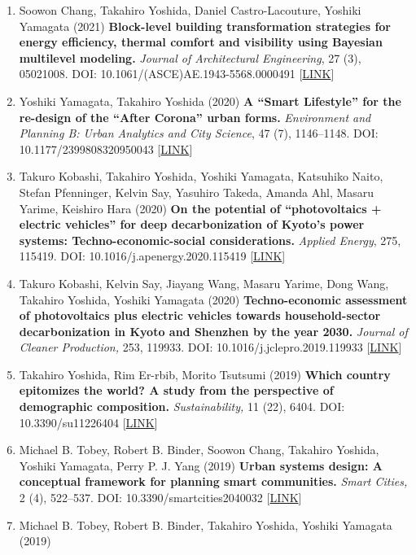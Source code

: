 \documentclass[
]{book}
\begin{document}
\begin{enumerate}
\item
  Soowon Chang, Takahiro Yoshida, Daniel Castro-Lacouture, Yoshiki Yamagata (2021) \textbf{Block-level building transformation strategies for energy efficiency, thermal comfort and visibility using Bayesian multilevel modeling.}
  \emph{Journal of Architectural Engineering}, 27 (3), 05021008.
  DOI: 10.1061/(ASCE)AE.1943-5568.0000491 {[}\href{https://ascelibrary.org/doi/abs/10.1061/\%28ASCE\%29AE.1943-5568.0000491}{LINK}{]}
\item
  Yoshiki Yamagata, Takahiro Yoshida (2020)
  \textbf{A ``Smart Lifestyle'' for the re-design of the ``After Corona'' urban forms.}
  \emph{Environment and Planning B: Urban Analytics and City Science}, 47 (7), 1146--1148.
  DOI: 10.1177/2399808320950043 {[}\href{http://dx.doi.org/10.1177/2399808320950043}{LINK}{]}
\item
  Takuro Kobashi, Takahiro Yoshida, Yoshiki Yamagata, Katsuhiko Naito, Stefan Pfenninger, Kelvin Say, Yasuhiro Takeda, Amanda Ahl, Masaru Yarime, Keishiro Hara (2020)
  \textbf{On the potential of ``photovoltaics + electric vehicles'' for deep decarbonization of Kyoto's power systems: Techno-economic-social considerations.}
  \emph{Applied Energy}, 275, 115419.
  DOI: 10.1016/j.apenergy.2020.115419 {[}\href{https://doi.org/10.1016/j.apenergy.2020.115419}{LINK}{]}
\item
  Takuro Kobashi, Kelvin Say, Jiayang Wang, Masaru Yarime, Dong Wang, Takahiro Yoshida, Yoshiki Yamagata (2020)
  \textbf{Techno-economic assessment of photovoltaics plus electric vehicles towards household-sector decarbonization in Kyoto and Shenzhen by the year 2030.}
  \emph{Journal of Cleaner Production,} 253, 119933.
  DOI: 10.1016/j.jclepro.2019.119933 {[}\href{https://doi.org/10.1016/j.jclepro.2019.119933}{LINK}{]}
\item
  Takahiro Yoshida, Rim Er-rbib, Morito Tsutsumi (2019)
  \textbf{Which country epitomizes the world? A study from the perspective of demographic composition.}
  \emph{Sustainability,} 11 (22), 6404.
  DOI: 10.3390/su11226404 {[}\href{https://www.mdpi.com/2071-1050/11/22/6404}{LINK}{]}
\item
  Michael B. Tobey, Robert B. Binder, Soowon Chang, Takahiro Yoshida, Yoshiki Yamagata, Perry P. J. Yang (2019)
  \textbf{Urban systems design: A conceptual framework for planning smart communities.}
  \emph{Smart Cities,} 2 (4), 522--537.
  DOI: 10.3390/smartcities2040032 {[}\href{https://www.mdpi.com/2624-6511/2/4/32}{LINK}{]}
\item
  Michael B. Tobey, Robert B. Binder, Takahiro Yoshida, Yoshiki Yamagata (2019)

\end{enumerate}
\end{document}
